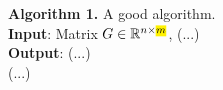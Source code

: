 \algruletop{}
\textbf{Algorithm 1.} A good algorithm. \\
\textbf{Input}: Matrix $G \in \mathbb{R}^{n \times \highlightpartmath{m}}$, (...) \\
\textbf{Output}: (...) \\
(...) \\
\algrulebottom{}